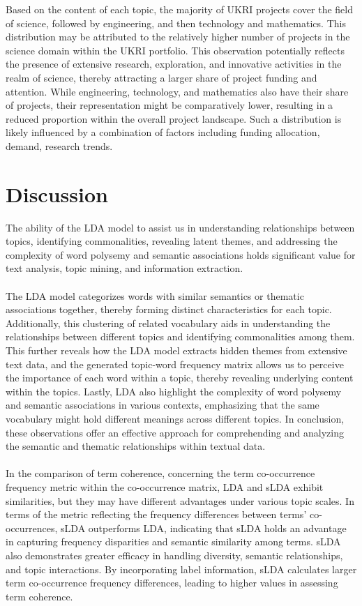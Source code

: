 \documentclass[12pt,twoside]{article}
\begin{document}
Based on the content of each topic, the majority of UKRI projects cover the field of science, followed by engineering, and then technology and mathematics. This distribution may be attributed to the relatively higher number of projects in the science domain within the UKRI portfolio. This observation potentially reflects the presence of extensive research, exploration, and innovative activities in the realm of science, thereby attracting a larger share of project funding and attention. While engineering, technology, and mathematics also have their share of projects, their representation might be comparatively lower, resulting in a reduced proportion within the overall project landscape. Such a distribution is likely influenced by a combination of factors including funding allocation, demand, research trends.

\newpage
\section{Discussion}

The ability of the LDA model to assist us in understanding relationships between topics, identifying commonalities, revealing latent themes, and addressing the complexity of word polysemy and semantic associations holds significant value for text analysis, topic mining, and information extraction.\\\\

The LDA model categorizes words with similar semantics or thematic associations together, thereby forming distinct characteristics for each topic. Additionally, this clustering of related vocabulary aids in understanding the relationships between different topics and identifying commonalities among them. This further reveals how the LDA model extracts hidden themes from extensive text data, and the generated topic-word frequency matrix allows us to perceive the importance of each word within a topic, thereby revealing underlying content within the topics. Lastly, LDA also highlight the complexity of word polysemy and semantic associations in various contexts, emphasizing that the same vocabulary might hold different meanings across different topics. In conclusion, these observations offer an effective approach for comprehending and analyzing the semantic and thematic relationships within textual data.\\\\

In the comparison of term coherence, concerning the term co-occurrence frequency metric within the co-occurrence matrix, LDA and sLDA exhibit similarities, but they may have different advantages under various topic scales. In terms of the metric reflecting the frequency differences between terms' co-occurrences, sLDA outperforms LDA, indicating that sLDA holds an advantage in capturing frequency disparities and semantic similarity among terms. sLDA also demonstrates greater efficacy in handling diversity, semantic relationships, and topic interactions. By incorporating label information, sLDA calculates larger term co-occurrence frequency differences, leading to higher values in assessing term coherence.\\\\
\end{document}
